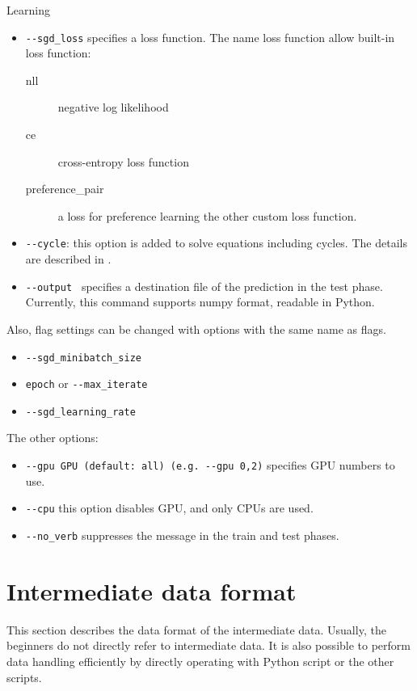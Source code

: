 \documentclass[a4paper]{report}
\begin{document}
Learning
\begin{itemize}
	\item \verb|--sgd_loss| specifies a loss function. The name loss function allow built-in loss function: 
	\begin{description}
		\item [nll] negative log likelihood
		\item [ce] cross-entropy loss function
		\item [preference\_pair] a loss for preference learning
		the other custom loss function.
	\end{description}
	\item \verb|--cycle|: this option is added to solve equations including cycles. The details are described in .
	\item \verb|--output | specifies a destination file of the prediction in the test phase. Currently, this command supports  numpy format, readable in Python.
\end{itemize}

Also, flag settings can be changed with options with the same name as flags.
\begin{itemize}
	\item \verb|--sgd_minibatch_size| 
	\item \verb|epoch| or \verb|--max_iterate|
	\item \verb|--sgd_learning_rate|
\end{itemize}

The other options:
\begin{itemize}
	\item \verb|--gpu GPU (default: all) (e.g. --gpu 0,2)|
	specifies GPU numbers to use.
	\item \verb|--cpu|
	this option disables GPU, and only CPUs are used.
	\item \verb|--no_verb| suppresses the message in the train and test phases.
\end{itemize}






\section{Intermediate data format}
\label{sec:intermediate_data}

This section describes the data format of the intermediate data.
Usually, the beginners do not directly refer to intermediate data.
It is also possible to perform data handling efficiently by directly operating with Python script or the other scripts.
\end{document}
